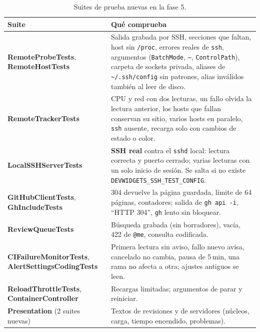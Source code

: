 \documentclass[11pt,a4paper]{article}
\begin{document}
\begin{table}[H]
\centering
\begin{tabularx}{\textwidth}{@{}lX@{}}
\toprule
\textbf{Suite} & \textbf{Qué comprueba}\\
\midrule
\textbf{RemoteProbeTests}, \textbf{RemoteHostTests} & Salida grabada
por SSH, secciones que faltan, host sin \texttt{/proc}, errores reales
de \texttt{ssh}, argumentos (\texttt{BatchMode}, \texttt{--},
\texttt{ControlPath}), carpeta de sockets privada, aliases de
\texttt{\textasciitilde/.ssh/config} sin patrones, alias inválidos
también al leer de disco.\\
\textbf{RemoteTrackerTests} & CPU y red con dos lecturas, un fallo
olvida la lectura anterior, los hosts que fallan conservan su sitio,
varios hosts en paralelo, \texttt{ssh} ausente, recarga solo con
cambios de estado o color.\\
\textbf{LocalSSHServerTests} & \textbf{SSH real} contra el
\texttt{sshd} local: lectura correcta y puerto cerrado; varias
lecturas con un solo inicio de sesión. Se salta si no existe
\texttt{DEVWIDGETS\_SSH\_TEST\_CONFIG}.\\
\textbf{GitHubClientTests}, \textbf{GhIncludeTests} & 304 devuelve
la página guardada, límite de 64 páginas, contadores; salida de
\texttt{gh api -i}, ``HTTP 304'', \texttt{gh} lento sin bloquear.\\
\textbf{ReviewQueueTests} & Búsqueda grabada (sin borradores),
vacía, 422 de \texttt{@me}, consulta codificada.\\
\textbf{CIFailureMonitorTests}, \textbf{AlertSettingsCodingTests} &
Primera lectura sin aviso, fallo nuevo avisa, cancelado no cambia,
pausa de 5\,min, una rama no afecta a otra; ajustes antiguos se leen.\\
\textbf{ReloadThrottleTests}, \textbf{ContainerController} &
Recargas limitadas; argumentos de parar y reiniciar.\\
\textbf{Presentation} (2 suites nuevas) & Textos de revisiones y de
servidores (núcleos, carga, tiempo encendido, problemas).\\
\bottomrule
\end{tabularx}
\caption{Suites de prueba nuevas en la fase 5.}
\end{table}
\end{document}
